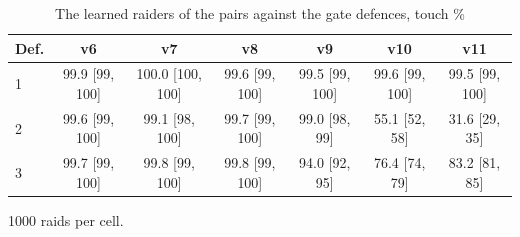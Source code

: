 \begin{table}[t]
\centering
\caption{The learned raiders of the pairs against the gate defences, touch \%}
\label{tab:T9_marl_raider_gates}
\begin{tabular}{lcccccc}
\toprule
Def. & v6 & v7 & v8 & v9 & v10 & v11 \\
\midrule
1 & 99.9 [99, 100] & 100.0 [100, 100] & 99.6 [99, 100] & 99.5 [99, 100] & 99.6 [99, 100] & 99.5 [99, 100] \\
2 & 99.6 [99, 100] & 99.1 [98, 100] & 99.7 [99, 100] & 99.0 [98, 99] & 55.1 [52, 58] & 31.6 [29, 35] \\
3 & 99.7 [99, 100] & 99.8 [99, 100] & 99.8 [99, 100] & 94.0 [92, 95] & 76.4 [74, 79] & 83.2 [81, 85] \\
\bottomrule
\end{tabular}
\par\smallskip\footnotesize 1000 raids per cell.
\end{table}
